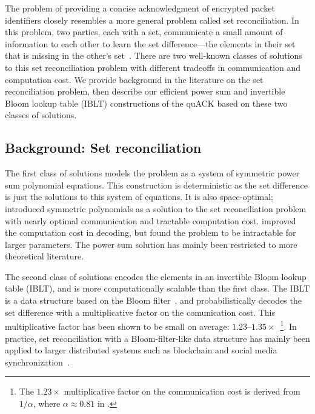 The problem of providing a concise acknowledgment of encrypted packet
identifiers closely resembles a more general problem called set reconciliation.
In this problem, two parties, each with a set, communicate a small amount of
information to each other to learn the set difference---the elements in their
set that is missing in the other's
set~\cite{minsky2003set,eppstein2011straggler}. There are two well-known classes
of solutions to this set reconciliation problem with different tradeoffs
in communication and computation cost.
We provide background in the literature on the set reconciliation problem,
then describe our efficient power sum and invertible Bloom lookup table (IBLT)
constructions of the quACK based on these two classes of solutions.

\subsection{Background: Set reconciliation}
\label{sec:quack:constructions:background}

The first class of solutions models the problem as a system of symmetric power
sum polynomial equations. This construction is deterministic as the set
difference is just the solutions to this system of equations. It is also
space-optimal; \cite{minsky2003set} introduced symmetric polynomials as a
solution to the set reconciliation problem with nearly optimal communication
and tractable computation cost. \cite{dodis2004fuzzy} improved the computation
cost in decoding, but found the problem to be intractable for larger parameters.
The power sum solution has mainly been restricted to more theoretical
literature.

The second class of solutions encodes the elements in an invertible Bloom lookup
table (IBLT), and is more computationally scalable than the first class. The
IBLT is a data structure based on the Bloom
filter~\cite{goodrich2011invertible}, and probabilistically decodes the set
difference with a multiplicative factor on the comunication cost. This
multiplicative factor has been shown to be small on average:
$1.23$--$1.35\times$~\cite{yang2024practical,baek2023simple}\footnote{The
$1.23\times$ multiplicative factor on the communication cost is derived from
$1/\alpha$, where $\alpha \approx 0.81$ in
\cite{baek2023simple}.}.
In practice, set reconciliation with a Bloom-filter-like data structure has
mainly been applied to larger distributed systems such as blockchain and social
media synchronization~\cite{yang2024practical,summermatter2021byzantine}.

